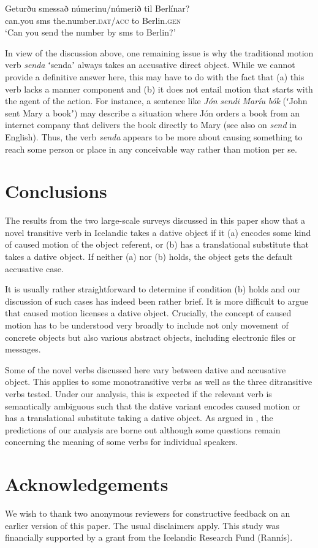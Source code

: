 \documentclass[output=paper,modfonts,nonflat,colorlinks,citecolor=brown]{langsci/langscibook}
\begin{document}
\ex
\gll   *Geturðu  smessað  númerinu/númerið  til  Berlínar?\\
 can.you  sms  the.number.\textsc{dat/acc}  to  Berlin.\textsc{gen}\\
\glt `Can you send the number by sms to Berlin?'
\z
\z

In view of the discussion above, one remaining issue is why the traditional motion verb \textit{senda} ʻsendaʼ always takes an accusative direct object. While we cannot provide a definitive answer here, this may have to do with the fact that (a) this verb lacks a manner component and (b) it does not entail motion that starts with the agent of the action. For instance, a sentence like \textit{Jón} \textit{sendi} \textit{Maríu} \textit{bók} (ʻJohn sent Mary a bookʼ) may describe a situation where Jón orders a book from an internet company that delivers the book directly to Mary (see also \citealt{Beavers2011} on \textit{send} in English). Thus, the verb \textit{senda} appears to be more about causing something to reach some person or place in any conceivable way rather than motion per se.

\section{Conclusions}
\label{sec:jonsson:5}

The results from the two large-scale surveys discussed in this paper show that a novel transitive verb in Icelandic takes a dative object if it (a) encodes some kind of caused motion of the object referent, or (b) has a translational substitute that takes a dative object. If neither (a) nor (b) holds, the object gets the default accusative case.

It is usually rather straightforward to determine if condition (b) holds and our discussion of such cases has indeed been rather brief. It is more difficult to argue that caused motion licenses a dative object. Crucially, the concept of caused motion has to be understood very broadly to include not only movement of concrete objects but also various abstract objects, including electronic files or messages.

Some of the novel verbs discussed here vary between dative and accusative object. This applies to some monotransitive verbs as well as the three ditransitive verbs tested. Under our analysis, this is expected if the relevant verb is semantically ambiguous such that the dative variant encodes caused motion or has a translational substitute taking a dative object. As argued in , the predictions of our analysis are borne out although some questions remain concerning the meaning of some verbs for individual speakers.
\section*{Acknowledgements}

We wish to thank two anonymous reviewers for constructive feedback on an earlier version of this paper. The usual disclaimers apply. This study was financially supported by a grant from the Icelandic Research Fund (Rannís).
\sloppy\printbibliography[heading=subbibliography,notkeyword=this]
\end{document}
